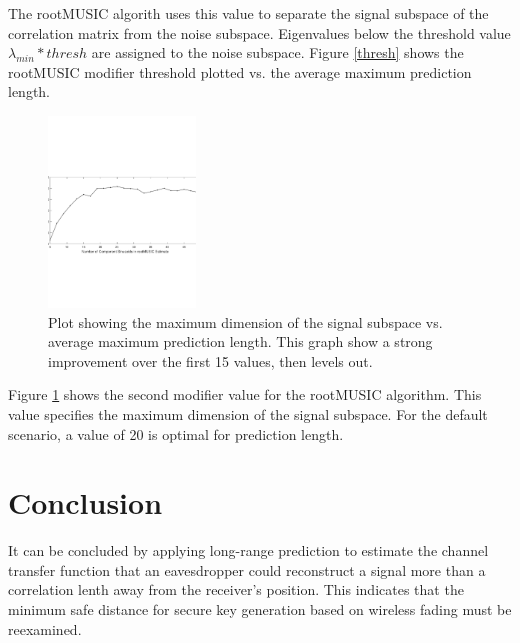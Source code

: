 \documentclass{allertonproc}
\begin{document}
The rootMUSIC algorith uses this value to separate the signal subspace of the correlation matrix from the noise subspace. Eigenvalues below the threshold value $\lambda_{min} *thresh$ are assigned to the noise subspace\cite{matlab}. Figure \ref{thresh} shows the rootMUSIC modifier threshold plotted vs. the average maximum prediction length. %

\begin{figure}[ht!]
\begin{center}
\includegraphics[height=2in]{numSinusoids}
\caption{Plot showing the maximum dimension of the signal subspace vs. average maximum prediction length. This graph show a strong improvement over the first 15 values, then levels out.}\label{sinusoid}
\end{center}
\end{figure}

Figure \ref{sinusoid} shows the second modifier value for the rootMUSIC algorithm. This value specifies the maximum dimension of the signal subspace. For the default scenario, a value of 20 is optimal for prediction length.


\section{Conclusion}

It can be concluded by applying long-range prediction to estimate the channel transfer function that an eavesdropper could reconstruct a signal more than a correlation lenth away from the receiver's position.  This indicates that the minimum safe distance for secure key generation based on wireless fading must be reexamined.
\end{document}
